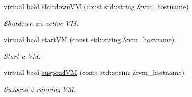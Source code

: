 \begin{DoxyCompactItemize}
virtual bool \hyperlink{classwrench_1_1_cloud_service_ac9ee0c086c699c0c690be88abc7a0f9c}{shutdown\+VM} (const std\+::string \&vm\+\_\+hostname)
\begin{DoxyCompactList}\small\item\em Shutdown an active VM. \end{DoxyCompactList}\item 
virtual bool \hyperlink{classwrench_1_1_cloud_service_a1a074e4259a9f1e786dab385ccf39e62}{start\+VM} (const std\+::string \&vm\+\_\+hostname)
\begin{DoxyCompactList}\small\item\em Start a VM. \end{DoxyCompactList}\item 
virtual bool \hyperlink{classwrench_1_1_cloud_service_a8607984fbc7a852319045e2248b7a6d9}{suspend\+VM} (const std\+::string \&vm\+\_\+hostname)
\begin{DoxyCompactList}\small\item\em Suspend a running VM. \end{DoxyCompactList}\end{DoxyCompactItemize}
